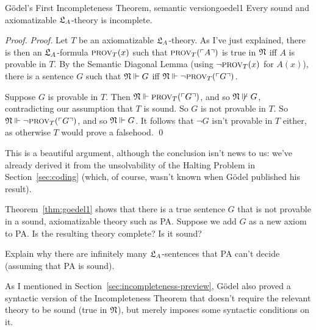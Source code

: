\begin{theorem}{Gödel's First Incompleteness Theorem, semantic version}{goedel1}
  Every sound and axiomatizable $\mathfrak{L}_A$-theory is incomplete.
\end{theorem}
\begin{proof}
  \emph{Proof.}
  Let $T$ be an axiomatizable $\mathfrak{L}_A$-theory.
  As I've just explained,
  there is then an $\mathfrak{L}_A$-formula $\smallcaps{Prov}_T(x)$ such that
  $\smallcaps{Prov}_T(\gn{A})$ is true in $\mathfrak{N}$ iff $A$ is provable in $T$.
  By the Semantic Diagonal Lemma
  (using $\neg \smallcaps{Prov}_T(x)$ for $A(x)$),
  there is a sentence $G$ such that $\mathfrak{N} \Vdash G$ iff
  $\Mod{N} \satisfies \neg \smallcaps{Prov}_T(\gn{G})$.

  Suppose $G$ is provable in $T$.
  Then $\Mod{N} \satisfies \smallcaps{Prov}_T(\gn{G})$,
  and so $\mathfrak{N} \not\Vdash G$,
  contradicting our assumption that $T$ is sound.
  So $G$ is not provable in $T$.
  So $\Mod{N} \satisfies \neg \smallcaps{Prov}_T(\gn{G})$,
  and so $\mathfrak{N} \Vdash G$.
  It follows that $\neg G$ isn't provable in $T$ either,
  as otherwise $T$ would prove a falsehood.
  \qed
\end{proof}

This is a beautiful argument,
although the conclusion isn't news to us:
we've already derived it from the unsolvability of the Halting Problem in Section~\ref{sec:coding}
(which, of course, wasn't known when Gödel published his result).

\begin{exercise}
  Theorem~\ref{thm:goedel1} shows that
  there is a true sentence $G$ that is not provable in a sound, axiomatizable theory such as PA.
  Suppose we add $G$ as a new axiom to PA.
  Is the resulting theory complete? Is it sound?
\end{exercise}

\begin{exercise}
  Explain why there are infinitely many $\mathfrak{L}_A$-sentences that PA can't decide
  (assuming that PA is sound).
\end{exercise}


As I mentioned in Section~\ref{sec:incompleteness-preview},
Gödel also proved a syntactic version of the Incompleteness Theorem
that doesn't require the relevant theory to be sound
(true in $\mathfrak{N}$),
but merely imposes some syntactic conditions on it.

